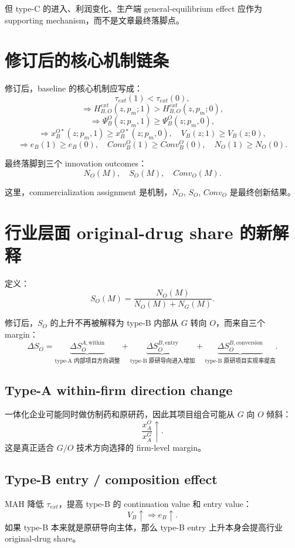 \documentclass[12pt]{article}
\begin{document}
但 type-C 的进入、利润变化、生产端 general-equilibrium effect 应作为 supporting mechanism，而不是文章最终落脚点。

\section{修订后的核心机制链条}

修订后，baseline 的核心机制应写成：
\[
\tau_{ext}(1)<\tau_{ext}(0),
\]
\[
\Rightarrow
H_{B,O}^{ext}(z,p_m;1)
>
H_{B,O}^{ext}(z,p_m;0),
\]
\[
\Rightarrow
\Psi_B^O(z;p_m,1)
\ge
\Psi_B^O(z;p_m,0),
\]
\[
\Rightarrow
x_B^{O*}(z;p_m,1)
\ge
x_B^{O*}(z;p_m,0),
\quad
V_B(z;1)\ge V_B(z;0),
\]
\[
\Rightarrow
e_B(1)\ge e_B(0),
\quad
Conv_B^O(1)\ge Conv_B^O(0),
\quad
N_O(1)\ge N_O(0).
\]

最终落脚到三个 innovation outcomes：
\[
N_O(M),\quad S_O(M),\quad Conv_O(M).
\]

这里，commercialization assignment 是机制，$N_O$, $S_O$, $Conv_O$ 是最终创新结果。

\section{行业层面 original-drug share 的新解释}

定义：
\[
S_O(M)
=
\frac{N_O(M)}{N_O(M)+N_G(M)}.
\]

修订后，$S_O$ 的上升不再被解释为 type-B 内部从 $G$ 转向 $O$，而来自三个 margin：
\[
\Delta S_O
=
\underbrace{\Delta S_O^{A,\mathrm{within}}}_{\text{type-A 内部项目方向调整}}
+
\underbrace{\Delta S_O^{B,\mathrm{entry}}}_{\text{type-B 原研导向进入增加}}
+
\underbrace{\Delta S_O^{B,\mathrm{conversion}}}_{\text{type-B 原研项目实现率提高}}.
\]

\subsection{Type-A within-firm direction change}

一体化企业可能同时做仿制药和原研药，因此其项目组合可能从 $G$ 向 $O$ 倾斜：
\[
\frac{x_A^O}{x_A^G}\uparrow.
\]
这是真正适合 $G/O$ 技术方向选择的 firm-level margin。

\subsection{Type-B entry / composition effect}

MAH 降低 $\tau_{ext}$，提高 type-B 的 continuation value 和 entry value：
\[
V_B\uparrow
\Rightarrow
e_B\uparrow.
\]
如果 type-B 本来就是原研导向主体，那么 type-B entry 上升本身会提高行业 original-drug share。
\end{document}
